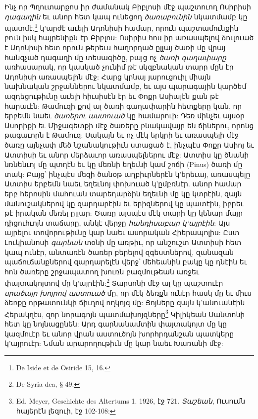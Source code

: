 \documentclass{article}
\begin{document}
{Ինչ որ Պղուտարքոս իր ժամանակ Բիբլոսի մէջ պաշտուող Ոսիրիսի \emph{դագաղին} եւ անոր հետ կապ ունեցող \emph{ծառաբունին} նկատմամբ կը պատմէ,\footnote{De Iside et de Osiride 15, 16.} կ'արժէ աւելի Ադոնիսի համար, որուն պաշտամունքին բուն իսկ հայրենիքն էր Բիբլոս: Ոսիրիս հոս իր առասպելով ձուլուած է Ադոնիսի հետ որուն թերեւս հաղորդած ըլլայ ծառի մը վրայ հանգչած դագաղի մը տեսագիծը, բայց ոչ \emph{ծառի գաղափարը} առհասարակ, որ կասկած չունիմ թէ սկզբնական տարր մըն էր Ադոնիսի առասպելին մէջ: Հարց կրնայ յարուցուիլ միայն նախնական շրջաններու նկատմամբ, եւ այս պարագային կարծեմ ազդեցութիւնը աւելի հիւսիսէն էր եւ Փոքր Ասիայէն քան թէ հարաւէն: Թամուզի քով ալ ծառի գաղափարին հետքերը կան, որ երբեմն նաեւ \emph{ծառերու աստուած} կը համարուի: Դեռ մինչեւ այսօր Ասորիքի եւ Միջագետքի մէջ ծառերը բնակավայր են ճիներու, որոնց թագաւորն է Թամուզ: Սակայն եւ ոչ մէկ երկրի եւ առասպելի մէջ ծառը այնչափ մեծ նշանակութիւն ստացած է, ինչպէս Փոքր Ասիոյ եւ Ատտիսի եւ անոր մերձաւոր առասպելներու մէջ: Ատտիս կը ծնանի նռնենւոյ մը պտղէն եւ կը մեռնի եղեւնի կամ շոճի (Pinus) ծառի մը տակ: Բայց՝ ինչպէս մեզի ծանօթ աղբիւրներէն կ'երեւայ, առասպելը Ատտիս երբեմն նաեւ եղեւնոյ փոխուած կ'ըմբռնէր. անոր համար երբ հերոսին մահուան տարեդարձին եղեւնի մը կը կտրէին, զայն մանուշակներով կը զարդարէին եւ երիզներով կը պատէին, իբրեւ թէ իրական մեռել ըլլար: Ծառը այսպէս մէկ տարի կը կենար մայր դիցուհւոյն տաճարը, անկէ վերջը \emph{հանդիսաբար կ'այրէին}: Այս այրելու տովորութիւնը կար նաեւ ասորական Հիերապոլիս: Ըստ Լուկիանոսի \emph{գարնան} տօնի մը առթիւ, որ անշուշտ Ատտիսի հետ կապ ունէր, անտառէն ծառեր բերելով զգեստներով, զանազան պաճուճանքներով զարդարելէն վերջ՝ մեհեանին բակը կը դնէին եւ հոն ծառերը շրջապատող խուռն բազմութեան առջեւ փայտակոյտով մը կ'այրէին:\footnote{De Syria dea, § 49.} Տարսոնի մէջ ալ կը պաշտուէր \emph{սրածայր խոյրով աստուած} մը, որ մէկ ձեռքն ունէր հասկ մը եւ միւս ձեռքը որթատունկի ճիւղով ողկոյզ մը: Յոյները զայն կ'անուանէին Հերակղէս, զոր նորագոյն պատմախոյզները\footnote{Ed. Meyer, Geschichte des Altertums 1. 1926, էջ 721. \emph{Տաշեան}, Ուսումն հայերէն լեզուի, էջ 102-108:} Կիլիկեան Սանտոնի հետ կը նոյնացընեն: Արդ գարնանամտին փայտակոյտ մը կը կազմուէր եւ անոր վրան աստուծոյն խորհրդանշան պատկերը կ'այրուէր: Նման արարողութիւն մը կար նաեւ Խառանի մէջ:

}
\end{document}
